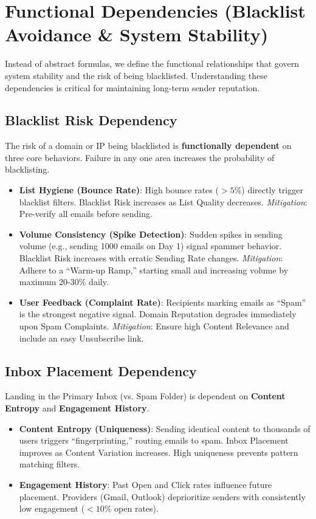 \documentclass{article}
\begin{document}
\section{Functional Dependencies (Blacklist Avoidance \& System Stability)}
Instead of abstract formulas, we define the functional relationships that govern system stability and the risk of being blacklisted. Understanding these dependencies is critical for maintaining long-term sender reputation.

\subsection{Blacklist Risk Dependency}
The risk of a domain or IP being blacklisted is \textbf{functionally dependent} on three core behaviors. Failure in any one area increases the probability of blacklisting.
\begin{itemize}
    \item \textbf{List Hygiene (Bounce Rate)}: High bounce rates ($>5\%$) directly trigger blacklist filters. Blacklist Risk increases as List Quality decreases. \textit{Mitigation}: Pre-verify all emails before sending.
    \item \textbf{Volume Consistency (Spike Detection)}: Sudden spikes in sending volume (e.g., sending 1000 emails on Day 1) signal spammer behavior. Blacklist Risk increases with erratic Sending Rate changes. \textit{Mitigation}: Adhere to a ``Warm-up Ramp,'' starting small and increasing volume by maximum 20-30\% daily.
    \item \textbf{User Feedback (Complaint Rate)}: Recipients marking emails as ``Spam'' is the strongest negative signal. Domain Reputation degrades immediately upon Spam Complaints. \textit{Mitigation}: Ensure high Content Relevance and include an easy Unsubscribe link.
\end{itemize}

\subsection{Inbox Placement Dependency}
Landing in the Primary Inbox (vs. Spam Folder) is dependent on \textbf{Content Entropy} and \textbf{Engagement History}.
\begin{itemize}
    \item \textbf{Content Entropy (Uniqueness)}: Sending identical content to thousands of users triggers ``fingerprinting,'' routing emails to spam. Inbox Placement improves as Content Variation increases. High uniqueness prevents pattern matching filters.
    \item \textbf{Engagement History}: Past Open and Click rates influence future placement. Providers (Gmail, Outlook) deprioritize senders with consistently low engagement ($<10\%$ open rates).
\end{itemize}
\end{document}
